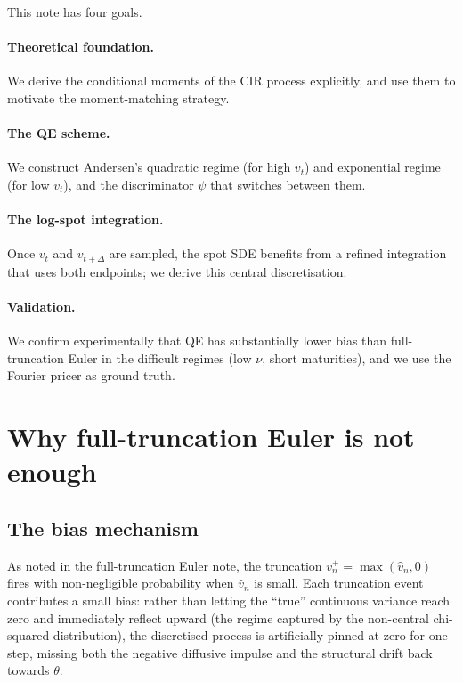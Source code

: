 \documentclass[11pt]{article}
\theoremstyle{plain}
\theoremstyle{definition}
\theoremstyle{remark}
\begin{document}
This note has four goals.

\paragraph{Theoretical foundation.} We derive the conditional moments of the CIR process explicitly, and use them to motivate the moment-matching strategy.

\paragraph{The QE scheme.} We construct Andersen's quadratic regime (for high $v_t$) and exponential regime (for low $v_t$), and the discriminator $\psi$ that switches between them.

\paragraph{The log-spot integration.} Once $v_t$ and $v_{t+\Delta}$ are sampled, the spot SDE benefits from a refined integration that uses both endpoints; we derive this central discretisation.

\paragraph{Validation.} We confirm experimentally that QE has substantially lower bias than full-truncation Euler in the difficult regimes (low $\nu$, short maturities), and we use the Fourier pricer as ground truth.

\section{Why full-truncation Euler is not enough}

\subsection{The bias mechanism}

As noted in the full-truncation Euler note, the truncation $v_n^+ = \max(\hat v_n, 0)$ fires with non-negligible probability when $\hat v_n$ is small. Each truncation event contributes a small bias: rather than letting the ``true'' continuous variance reach zero and immediately reflect upward (the regime captured by the non-central chi-squared distribution), the discretised process is artificially pinned at zero for one step, missing both the negative diffusive impulse and the structural drift back towards $\theta$.
\end{document}

